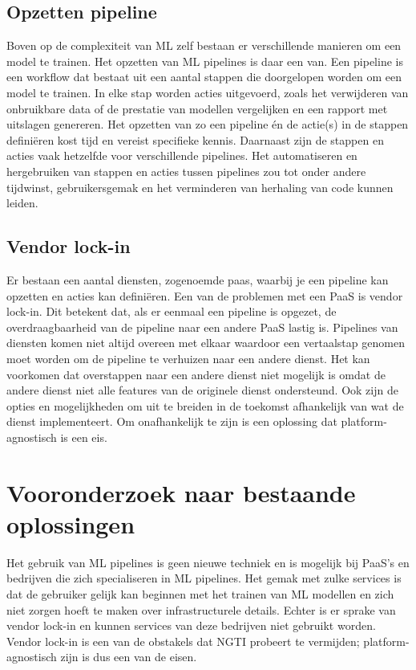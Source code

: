 \subsection{Opzetten pipeline}\label{subsec:ch2-opzetten-pipeline}
Boven op de complexiteit van ML zelf bestaan er verschillende manieren om een model te trainen. Het opzetten van ML pipelines is daar een van. Een pipeline is een workflow dat bestaat uit een aantal stappen die doorgelopen worden om een model te trainen. In elke stap worden acties uitgevoerd, zoals het verwijderen van onbruikbare data of de prestatie van modellen vergelijken en een rapport met uitslagen genereren. Het opzetten van zo een pipeline én de actie(s) in de stappen definiëren kost tijd en vereist specifieke kennis. Daarnaast zijn de stappen en acties vaak hetzelfde voor verschillende pipelines. Het automatiseren en hergebruiken van stappen en acties tussen pipelines zou tot onder andere tijdwinst, gebruikersgemak en het verminderen van herhaling van code kunnen leiden.

\subsection{Vendor lock-in}\label{subsec:ch2-vendor-lock-in}
Er bestaan een aantal diensten, zogenoemde \acrfull{paas}, waarbij je een pipeline kan opzetten en acties kan definiëren. Een van de problemen met een PaaS is vendor lock-in. Dit betekent dat, als er eenmaal een pipeline is opgezet, de overdraagbaarheid van de pipeline naar een andere PaaS lastig is. Pipelines van diensten komen niet altijd overeen met elkaar waardoor een vertaalstap genomen moet worden om de pipeline te verhuizen naar een andere dienst. Het kan voorkomen dat overstappen naar een andere dienst niet mogelijk is omdat de andere dienst niet alle features van de originele dienst ondersteund. Ook zijn de opties en mogelijkheden om uit te breiden in de toekomst afhankelijk van wat de dienst implementeert. Om onafhankelijk te zijn is een oplossing dat platform-agnostisch is een eis.

\section{Vooronderzoek naar bestaande oplossingen}\label{sec:ch2-vooronderzoek-naar-bestaande-oplossingen}
Het gebruik van ML pipelines is geen nieuwe techniek en is mogelijk bij PaaS's en bedrijven die zich specialiseren in ML pipelines. Het gemak met zulke services is dat de gebruiker gelijk kan beginnen met het trainen van ML modellen en zich niet zorgen hoeft te maken over infrastructurele details. Echter is er sprake van vendor lock-in en kunnen services van deze bedrijven niet gebruikt worden. Vendor lock-in is een van de obstakels dat NGTI probeert te vermijden; platform-agnostisch zijn is dus een van de eisen.

